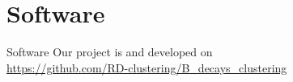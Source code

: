 \section{Software}
\begin{frame}{Software}
	Our project is  and  developed on
	\\
	{\color{purple}\url{https://github.com/RD-clustering/B_decays_clustering}}
	

\end{frame}
